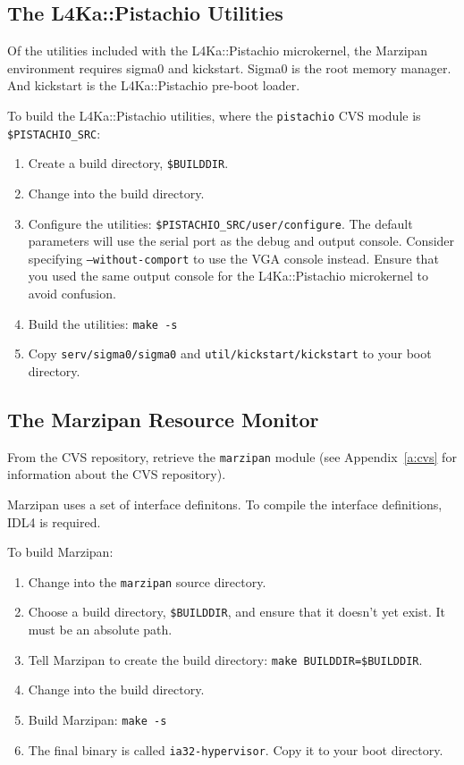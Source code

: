 \documentclass[twoside,a4paper]{report}
\newcommand{\code}[1]{{\tt #1}}
\newcommand{\cmd}[1]{\code{#1}}
\newcommand{\Pistachio}{L4Ka::Pistachio}
\newcommand{\IDL}{IDL4}
\begin{document}
\subsection{The \Pistachio{} Utilities}

Of the utilities included with the \Pistachio{} microkernel, the
Marzipan environment requires sigma0 and kickstart.  Sigma0 is the
root memory manager.  And kickstart is the \Pistachio{} pre-boot
loader.

To build the \Pistachio{} utilities, where the \code{pistachio} CVS
module is \code{\$PISTACHIO\_SRC}:
\begin{enumerate}
\item Create a build directory, \code{\$BUILDDIR}.
\item Change into the build directory.
\item Configure the utilities: \cmd{\$PISTACHIO\_SRC/user/configure}.
      The default parameters will use the serial port as the debug and
      output console.  Consider specifying
      \code{--without-comport} to use the VGA console instead.  Ensure
      that you used the same output console for the \Pistachio{}
      microkernel to avoid confusion.
\item Build the utilities: \cmd{make -s}
\item Copy \code{serv/sigma0/sigma0} and
      \code{util/kickstart/kickstart} to your boot directory.
\end{enumerate}


\subsection{The Marzipan Resource Monitor}

From the CVS repository, retrieve the \code{marzipan} module
(see Appendix~\ref{a:cvs} for information about the CVS repository).

Marzipan uses a set of interface definitons.  To compile the interface
definitions, \IDL{} is required.

To build Marzipan:
\begin{enumerate}
\item Change into the \code{marzipan} source directory.
\item Choose a build directory, \code{\$BUILDDIR}, and ensure that it
doesn't yet exist.  It must be an absolute path.
\item Tell Marzipan to create the build directory: 
\cmd{make BUILDDIR=\$BUILDDIR}.
\item Change into the build directory.
\item Build Marzipan: \cmd{make -s}
\item The final binary is called \code{ia32-hypervisor}.  Copy it to
your boot directory.
\end{enumerate}
\end{document}

